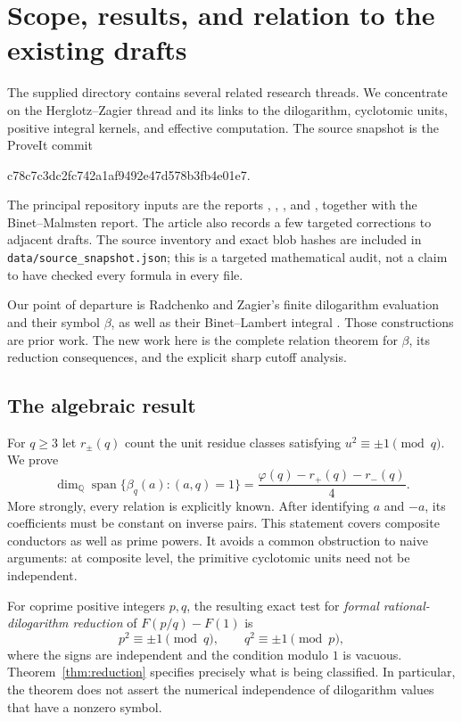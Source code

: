 \documentclass[11pt]{article}
\numberwithin{equation}{section}
\theoremstyle{definition}
\theoremstyle{remark}
\newcommand{\Q}{\mathbb Q}
\DeclareMathOperator{\Span}{span}
\begin{document}
\section{Scope, results, and relation to the existing drafts}
\label{sec:scope}

The supplied directory contains several related research threads. We
concentrate on the Herglotz--Zagier thread and its links to the dilogarithm,
cyclotomic units, positive integral kernels, and effective computation.
The source snapshot is the ProveIt commit \cite{ProveIt}
\begin{center}\small\ttfamily
c78c7c3dc2fc742a1af9492e47d578b3fb4e01e7.
\end{center}
The principal repository inputs are the reports
, ,
, and , together
with the Binet--Malmsten report. The article also records a few targeted
corrections to adjacent drafts. The source inventory and exact blob hashes
are included in \texttt{data/source\_snapshot.json}; this is a targeted
mathematical audit, not a claim to have checked every formula in every file.

Our point of departure is Radchenko and Zagier's finite dilogarithm
evaluation and their symbol $\beta$, as well as their Binet--Lambert
integral \cite{RZ}. Those constructions are prior work. The new work here
is the complete relation theorem for $\beta$, its reduction consequences,
and the explicit sharp cutoff analysis.

\subsection{The algebraic result}

For $q\ge3$ let $r_\pm(q)$ count the unit residue classes satisfying
$u^2\equiv\pm1\pmod q$. We prove
\begin{equation}\label{eq:rank-intro}
 \dim_\Q\Span\{\beta_q(a):(a,q)=1\}
 =\frac{\varphi(q)-r_+(q)-r_-(q)}4.
\end{equation}
More strongly, every relation is explicitly known. After identifying
$a$ and $-a$, its coefficients must be constant on inverse pairs.
This statement covers composite conductors as well as prime powers.
It avoids a common obstruction to naive arguments: at composite level,
the primitive cyclotomic units need not be independent.

For coprime positive integers $p,q$, the resulting exact test for
\emph{formal rational-dilogarithm reduction} of $F(p/q)-F(1)$ is
\begin{equation}\label{eq:pair-intro}
 p^2\equiv\pm1\pmod q,
 \qquad q^2\equiv\pm1\pmod p,
\end{equation}
where the signs are independent and the condition modulo $1$ is vacuous.
Theorem~\ref{thm:reduction} specifies precisely what is being classified.
In particular, the theorem does not assert the numerical independence of
dilogarithm values that have a nonzero symbol.
\end{document}
